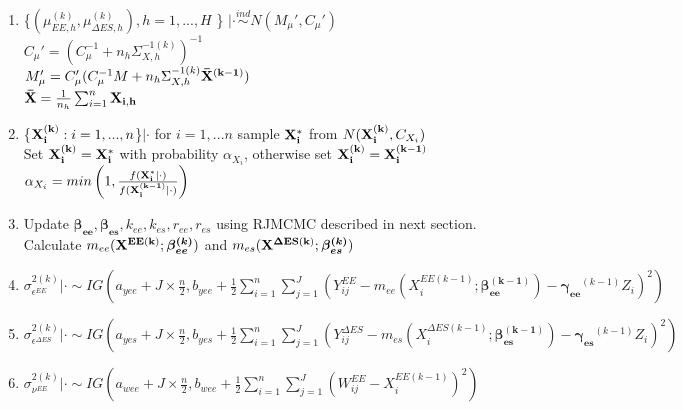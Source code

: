\documentclass[11pt]{article}\usepackage[]{graphicx}\usepackage[]{color}
\begin{document}
\begin{enumerate}
\begin{enumerate}
\item
 \{$(\mu_{EE,h}^{(k)},\mu_{\Delta ES,h}^{(k)}), h=1,...,H$ \} $|\cdot \overset{ind}{\sim} N(M_{\mu}',C_{\mu}')$ \\
$C_{\mu}' = (C_{\mu}^{-1} + n_h \Sigma_{X,h}^{-1(k)})^{-1}$ \\
$M_{\mu}' = C_{\mu}'(C_{\mu}^{-1}M + n_h \Sigma_{X,h}^{-1(k)} {\bf \bar{X}^{(k-1)}})$ \\
${\bf \bar{X}} = \frac{1}{n_h}\sum_{i=1}^{n} {\bf X_{i,h}}$ \\

 

\item
\{${\bf X_i^{(k)}}:i=1,...,n $\}$|\cdot$ for $i=1,...n$ sample ${\bf X_i^*}$ from $N({\bf X_i^{(k)}},C_{X_i})$ \\

Set ${\bf X_i^{(k)}} = {\bf X_i^*}$ with probability $\alpha_{X_i}$, otherwise set ${\bf X_i^{(k)}} = {\bf X_i^{(k-1)}}$ \\

$\alpha_{X_i} = min\left(1, \frac{f({\bf X_i^*}|\cdot)}{f({\bf X_i^{(k-1)}}|\cdot)}  \right)$ \\

\item
Update ${\boldsymbol{\beta_{ee}},\boldsymbol{\beta_{es}}},k_{ee},k_{es}, {  r_{ee}, r_{es}}$ using RJMCMC described in next section. Calculate $m_{ee}({\bf X^{EE(k)}};\boldsymbol{\beta_{ee}^{(k)}})$ and $m_{es}({\bf X^{\Delta ES(k)}};\boldsymbol{\beta_{es}^{(k)}})$ \\

\item
 $\sigma^{2(k)}_{\epsilon^{EE}} |\cdot \sim IG(a_{yee}+J\times \frac{n}{2},b_{yee}+\frac{1}{2}\sum_{i=1}^{n}\sum_{j=1}^{J}(Y_{ij}^{EE}-m_{ee}(X_i^{EE(k-1)};\boldsymbol{\beta_{ee}^{(k-1)}})-\boldsymbol{\gamma_{ee}}^{(k-1)}Z_i)^2)$ \\
 

\item
 $\sigma^{2(k)}_{\epsilon^{\Delta ES}} |\cdot \sim IG(a_{yes}+J\times \frac{n}{2},b_{yes}+\frac{1}{2}\sum_{i=1}^{n}\sum_{j=1}^{J}(Y_{ij}^{\Delta ES}-m_{es}(X_i^{\Delta ES(k-1)};\boldsymbol{\beta_{es}^{(k-1)}})-\boldsymbol{\gamma_{es}}^{(k-1)}Z_i)^2)$ \\
 
 
\item
 $\sigma^{2(k)}_{\nu^{EE}} |\cdot \sim IG(a_{wee}+J\times \frac{n}{2},b_{wee}+\frac{1}{2}\sum_{i=1}^{n}\sum_{j=1}^{J}(W_{ij}^{EE}-X_i^{EE(k-1)})^2)$ \\
 

\end{enumerate}
\end{enumerate}
\end{document}
